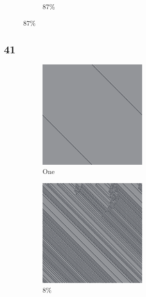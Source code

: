 \documentclass[12pt, fleqn]{report}                             %
\theoremstyle{break}                                            %
\begin{document}
\begin{figure}[ht!]
\begin{subfigure}[b]{0.4\linewidth}
          \caption{87\%}
        \end{subfigure}
      \end{figure}


      \clearpage
      \subsection{41}
      \begin{figure}[ht!]
        \centering
        \begin{subfigure}[b]{0.4\linewidth}
          \includegraphics[width=0.6\textwidth]{Images/41/a.png}
          \caption{One}
        \end{subfigure}
        \begin{subfigure}[b]{0.4\linewidth}
          \includegraphics[width=0.6\textwidth]{Images/41/b.png}
          \caption{8\%}
        \end{subfigure}
        \begin{subfigure}[b]{0.4\linewidth}

\end{subfigure}
\end{figure}
\end{document}

